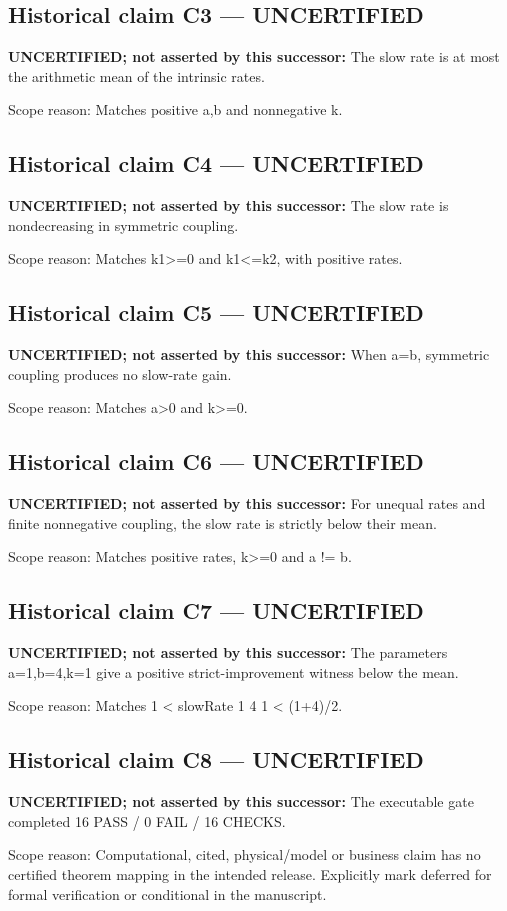 \documentclass[11pt]{article}
\begin{document}
\subsection*{Historical claim C3 --- UNCERTIFIED}
\textbf{UNCERTIFIED; not asserted by this successor:} The slow rate is at most the arithmetic mean of the intrinsic rates.
\par Scope reason: Matches positive a,b and nonnegative k.
\subsection*{Historical claim C4 --- UNCERTIFIED}
\textbf{UNCERTIFIED; not asserted by this successor:} The slow rate is nondecreasing in symmetric coupling.
\par Scope reason: Matches k1>=0 and k1<=k2, with positive rates.
\subsection*{Historical claim C5 --- UNCERTIFIED}
\textbf{UNCERTIFIED; not asserted by this successor:} When a=b, symmetric coupling produces no slow-rate gain.
\par Scope reason: Matches a>0 and k>=0.
\subsection*{Historical claim C6 --- UNCERTIFIED}
\textbf{UNCERTIFIED; not asserted by this successor:} For unequal rates and finite nonnegative coupling, the slow rate is strictly below their mean.
\par Scope reason: Matches positive rates, k>=0 and a != b.
\subsection*{Historical claim C7 --- UNCERTIFIED}
\textbf{UNCERTIFIED; not asserted by this successor:} The parameters a=1,b=4,k=1 give a positive strict-improvement witness below the mean.
\par Scope reason: Matches 1 < slowRate 1 4 1 < (1+4)/2.
\subsection*{Historical claim C8 --- UNCERTIFIED}
\textbf{UNCERTIFIED; not asserted by this successor:} The executable gate completed 16 PASS / 0 FAIL / 16 CHECKS.
\par Scope reason: Computational, cited, physical/model or business claim has no certified theorem mapping in the intended release. Explicitly mark deferred for formal verification or conditional in the manuscript.
\end{document}
